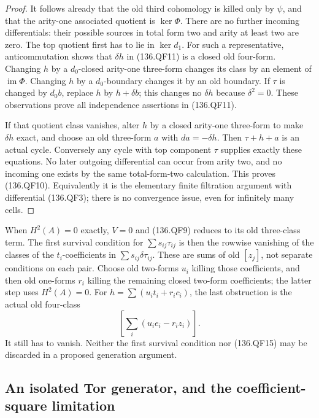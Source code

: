 \begin{proof}
It follows already that the old third cohomology is killed
only by \(\psi\), and that the arity-one associated quotient
is \(\ker\Phi\).  There are no further incoming differentials:
their possible sources in total form two and arity at least two
are zero.  The top quotient first has to lie in \(\ker d_1\).
For such a representative, anticommutation shows that
\(\delta h\) in (136.QF11) is a closed old four-form.
Changing \(h\) by a \(d_0\)-closed arity-one three-form
changes its class by an element of \(\operatorname{im}\Phi\).
Changing \(h\) by a \(d_0\)-boundary changes it by an
old boundary.  If \(\tau\) is changed by \(d_0b\), replace
\(h\) by \(h+\delta b\); this changes no \(\delta h\)
because \(\delta^2=0\).  These observations prove all
independence assertions in (136.QF11).

If that quotient class vanishes, alter \(h\) by a closed
arity-one three-form to make \(\delta h\) exact, and choose
an old three-form \(a\) with \(da=-\delta h\).  Then
\(\tau+h+a\) is an actual cycle.  Conversely any cycle
with top component \(\tau\) supplies exactly these equations.
No later outgoing differential can occur from arity two, and
no incoming one exists by the same total-form-two calculation.
This proves (136.QF10).  Equivalently it is the elementary
finite filtration argument with differential (136.QF3);
there is no convergence issue, even for infinitely many cells.
\end{proof}

When \(H^2(A)=0\) exactly, \(V=0\) and (136.QF9)
reduces to its old three-class term.  The first survival
condition for \(\sum s_{ij}\tau_{ij}\) is then the rowwise
vanishing of the classes of the \(t_i\)-coefficients in
\(\sum s_{ij}\delta\tau_{ij}\).  These are sums of
old \([z_j]\), not separate conditions on each pair.
Choose old two-forms \(u_i\) killing those coefficients,
and then old one-forms \(r_i\) killing the remaining closed
two-form coefficients; the latter step uses \(H^2(A)=0\).
For \(h=\sum(u_i t_i+r_i c_i)\), the last obstruction is
the actual old four-class
\[
                              \left[\sum_i(u_i e_i-r_i z_i)\right].
                                                               \tag{136.QF15}
\]
It still has to vanish.  Neither the first survival condition
nor (136.QF15) may be discarded in a proposed generation argument.

\subsection{An isolated Tor generator, and the coefficient-square limitation}

